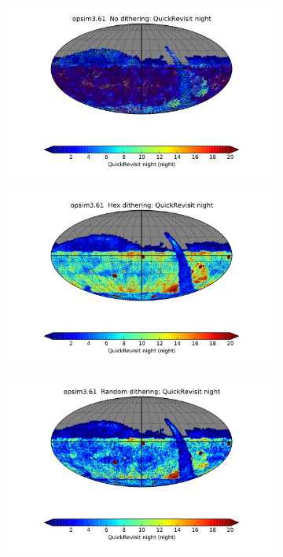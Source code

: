 \documentclass[]{spie}  %
\begin{document}
\begin{figure}
\begin{subfigure}[]{0.3\textwidth}
\includegraphics[width=\textwidth]{figures/opsim3_61_QuickRevisit_night__No_dithering_HEAL_SkyMap}
\caption[]{}
\label{subfig:revisitno}
\end{subfigure}
\begin{subfigure}[]{0.3\textwidth}
\includegraphics[width=\textwidth]{figures/opsim3_61_QuickRevisit_night__Hex_dithering_HEAL_SkyMap}
\caption[]{}
\label{subfig:revisithex}
\end{subfigure}
\begin{subfigure}[]{0.3\textwidth}
\includegraphics[width=\textwidth]{figures/opsim3_61_QuickRevisit_night__Random_dithering_HEAL_SkyMap}
\caption[]{}
\label{subfig:revisitrandom}
\end{subfigure}


\end{figure}
\end{document}

